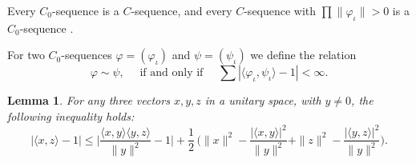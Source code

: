 \documentclass[twoside,11pt,letter]{article}
\theoremstyle{definition}
\theoremstyle{definition}
\theoremstyle{plain}
\newtheorem{lemma}[theorem]{Lemma}
\begin{document}
Every $C_0$-sequence is a $C$-sequence, and every $C$-sequence with $\prod\|\varphi_\iota\|>0$ is a $C_0$-sequence \cite{vN39}.

For two $C_0$-sequences $\varphi=(\varphi_\iota)$ and $\psi=(\psi_\iota)$ we define the relation
\begin{equation}\label{equivDef}
\varphi\sim\psi,\quad\text{ if and only if }\quad\sum|\langle \varphi_\iota,\psi_\iota\rangle-1|<\infty.
\end{equation}

\begin{lemma}\label{vNineqLem}
For any three vectors $x,y,z$ in a unitary space, with $y\neq 0$, the following inequality holds:
\begin{equation}\label{vNIneq}
|\langle x,z\rangle-1|\leq\Big|\frac{\langle x,y\rangle\langle y,z\rangle}{\|y\|^2}-1\Big|+\frac12\,\Big(\|x\|^2-\frac{|\langle x,y\rangle|^2}{\|y\|^2}+\|z\|^2-\frac{|\langle y,z\rangle|^2}{\|y\|^2}\Big).
\end{equation}
\end{lemma}
\end{document}
